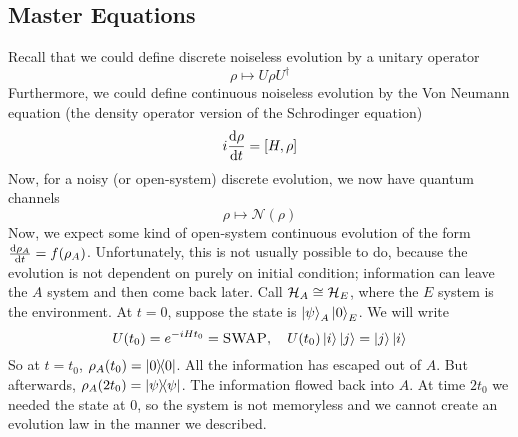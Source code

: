 \subsection{Master Equations}
Recall that we could define discrete noiseless evolution by a unitary operator
\[ \rho \mapsto U \rho U^{\dagger} \]
Furthermore, we could define continuous noiseless evolution by the Von Neumann equation (the
density operator version of the Schrodinger equation)
\[ i \dv{\rho}{t} = [H, \rho] \]
Now, for a noisy (or open-system) discrete evolution, we now have quantum channels
\[ \rho \mapsto \mathcal{N}(\rho) \]
Now, we expect some kind of open-system continuous evolution of the form $\dv{\rho_A}{t} = f(\rho_A)$.
Unfortunately, this is not usually possible to do, because the evolution is not dependent on purely on initial condition;
information can leave the $A$ system and then come back later. Call $\operatorname{\mathcal{H}}_A \cong \operatorname{\mathcal{H}}_E$, where the $E$ system
is the environment. At $t = 0$, suppose the state is $\ket{\psi}_A \ket{0}_E$. We will write
\[ U(t_0) = e^{-iHt_0} = \textsc{SWAP}, \quad U(t_0) \ket{i} \ket{j} = \ket{j} \ket{i} \]
So at $t = t_0$, $\rho_A(t_0) = \ketbra{0}$. All the information has escaped out of $A$. But afterwards,
$\rho_A(2 t_0) = \ketbra{\psi}$. The information flowed back into $A$. At time $2t_0$ we needed the state at $0$,
so the system is not memoryless and we cannot create an evolution law in the manner we described.

